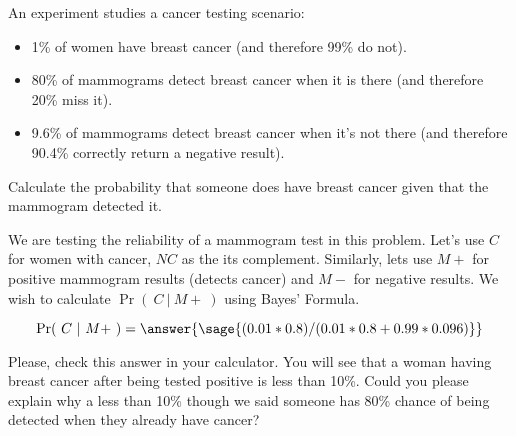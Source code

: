 \documentclass{ximera}
\begin{document}
\begin{problem}
An experiment studies a cancer testing scenario:
\begin{itemize}
    \item 1\% of women have breast cancer (and therefore 99\% do not).
    \item 80\% of mammograms detect breast cancer when it is there (and therefore 20\% miss it).
    \item 9.6\% of mammograms detect breast cancer when it’s not there (and therefore 90.4\% correctly return a negative result).
\end{itemize}
Calculate the probability that someone does have breast cancer given that the mammogram detected it.

\begin{hint}
We are testing the reliability of a mammogram test in this problem. Let's use $C$ for women with cancer,  $NC$ as the its complement. Similarly, lets use $M+$ for positive mammogram results (detects cancer) and $M-$ for negative results. We wish to calculate $\Pr(~C~|~M+~)$ using Bayes' Formula.
\end{hint}
$$\Pr(~C~|~M+~)
=\answer{\sage{(0.01*0.8)/(0.01*0.8+0.99*0.096)}}
$$

Please, check this answer in your calculator. You will see that a woman having breast cancer after being tested positive is less than 10\%. Could you please explain why a less than 10\% though we said someone has 80\% chance of being detected when they already have cancer?
\begin{freeResponse}

\end{freeResponse}
\end{problem}
\end{document}
